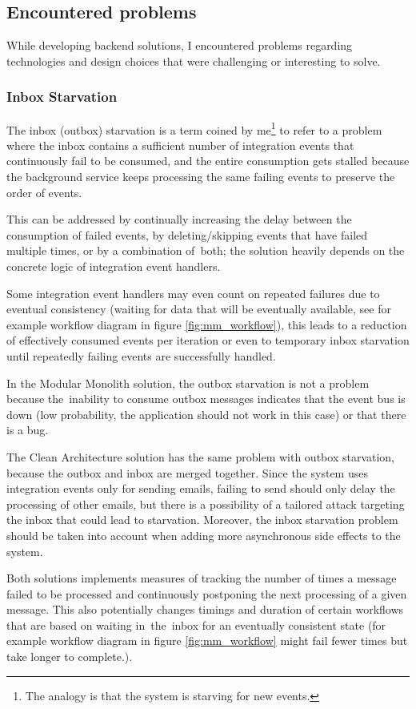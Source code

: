 \subsection{Encountered problems}
\label{dev:problems}
While developing backend solutions, I encountered problems regarding technologies and design choices that were challenging or interesting to solve. 

\subsubsection{Inbox Starvation}
The inbox (outbox) starvation is a term coined by me\footnote{The analogy is that the system is starving for new events.} to refer to a problem where the inbox contains a sufficient number of integration events that continuously fail to be consumed, and the entire consumption gets stalled because the background service keeps processing the same failing events to preserve the order of events.

This can be addressed by continually increasing the delay between the consumption of failed events, by deleting/skipping events that have failed multiple times, or by a combination of~both; the solution heavily depends on the concrete logic of integration event handlers.

Some integration event handlers may even count on repeated failures due to eventual consistency (waiting for data that will be eventually available, see for example workflow diagram in figure \ref{fig:mm_workflow}), this leads to a reduction of effectively consumed events per iteration or even to temporary inbox starvation until repeatedly failing events are successfully handled.

In the Modular Monolith solution, the outbox starvation is not a problem because the~inability to consume outbox messages indicates that the event bus is down (low probability, the application should not work in this case) or that there is a bug.

The Clean Architecture solution has the same problem with outbox starvation, because the outbox and inbox are merged together. Since the system uses integration events only for sending emails, failing to send should only delay the processing of other emails, but there is a possibility of a tailored attack targeting the inbox that could lead to starvation. Moreover, the inbox starvation problem should be taken into account when adding more asynchronous side effects to the system.

Both solutions implements measures of tracking the number of times a message failed to be processed and continuously postponing the next processing of a given message. This also potentially changes timings and duration of certain workflows that are based on waiting in~the~inbox for an eventually consistent state (for example workflow diagram in figure \ref{fig:mm_workflow} might fail fewer times but take longer to complete.).


